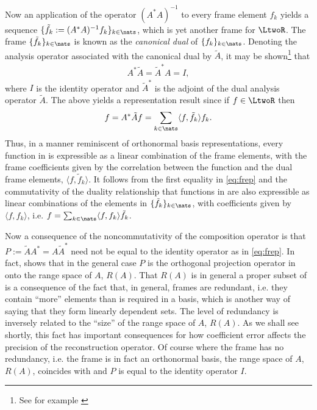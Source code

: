 Now an application of the operator $(A^*A)^{-1}$ to every frame element $f_k$ yields a sequence $\{\tilde{f}_k := (A^*A)^{-1}f_k\}_{k \in \nats}$, which  is yet another frame for $\LtwoR$. The frame $\{\tilde{f}_k\}_{k \in \nats}$ is known as the \emph{canonical dual} of $\{f_k\}_{k \in \nats}$. Denoting the  analysis operator associated with the canonical dual by $\tilde{A}$, it  may be shown\footnote{See for example \cite[][Proposition 3.2.3]{Daubechies1992}} that 
\begin{align}
  A^* \tilde{A}= \tilde{A}^* A = I,\label{eq:frep}
\end{align}
where $I$ is the  identity operator and $\tilde{A}^*$ is the adjoint of the dual analysis operator $\tilde{A}$. The above yields a representation result since if $f \in \LtwoR$ then  
\begin{align}
  f =  A^* \tilde{A}f = \sum_{k \in \nats}\langle f, \tilde{f}_k\rangle f_k.  
  \label{eq:frepresent}
\end{align}
Thus, in a manner reminiscent of orthonormal basis representations, every function in \LtwoR is expressible as a linear combination of the frame elements, with the frame coefficients given by the correlation between the function and the dual frame elements, $\langle f, \tilde{f}_k\rangle$. It follows from the first equality in \eqref{eq:frep} and the commutativity of the duality relationship that functions in \LtwoR are also expressible as linear combinations of the elements in $\{\tilde{f}_k\}_{k \in \nats}$, with coefficients given by $\langle f, {f}_k\rangle$, i.e. $f = \sum_{k \in \nats} \langle f, {f}_k\rangle \tilde{f}_k$.


Now a consequence of the noncommutativity of the composition operator is that  $P := \tilde{A}A^*  = A\tilde{A}^*$ need not be equal to the identity operator as in \eqref{eq:frep}. In fact, \citep[Proposition 3.2.3]{Daubechies1992} shows that in the general case $P$ is the orthogonal projection operator in \ltwo onto the range space of $A$, $R(A)$.   That $R(A)$ is in general a proper subset of \ltwo is a consequence of the fact that, in general, frames are redundant, i.e. they contain ``more'' elements than is required in a basis, which is another way of saying that they form linearly dependent sets. The level of redundancy is inversely related to the ``size'' of the range space of $A$, $R(A)$. As we shall see shortly, this fact has important consequences for how coefficient error affects the precision of the reconstruction operator. Of course where the frame has no redundancy, i.e. the frame  is in fact  an orthonormal basis, the range space of $A$, $R(A)$, coincides with \ltwo and $P$ is equal to the identity operator $I$. 
